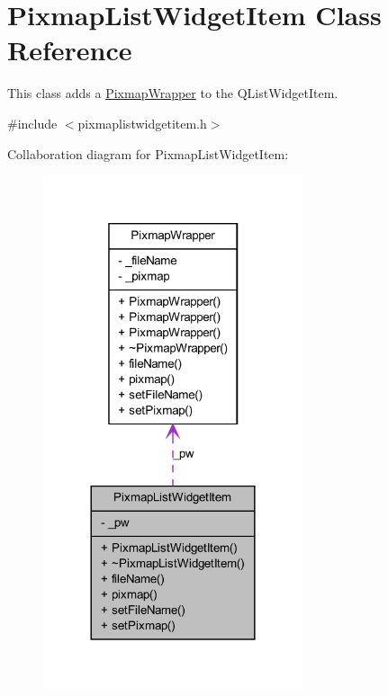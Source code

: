 \hypertarget{class_pixmap_list_widget_item}{
\section{PixmapListWidgetItem Class Reference}
\label{class_pixmap_list_widget_item}
}


This class adds a \hyperlink{class_pixmap_wrapper}{PixmapWrapper} to the QListWidgetItem.  




{\ttfamily \#include $<$pixmaplistwidgetitem.h$>$}



Collaboration diagram for PixmapListWidgetItem:
\nopagebreak
\begin{figure}[H]
\begin{center}
\leavevmode
\includegraphics[width=216pt]{class_pixmap_list_widget_item__coll__graph}
\end{center}
\end{figure}
